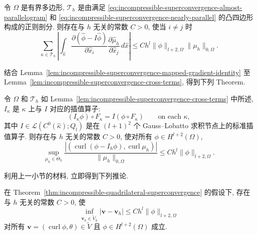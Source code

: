 \begin{Lemma}\label{lem:incompressible-superconvergence-cross-terms}
令 $\Omega$ 是有界多边形,
$\mathcal T_h$ 是由满足
\eqref{eq:incompressible-superconvergence-almost-parallelogram}
和 \eqref{eq:incompressible-superconvergence-nearly-parallel}
的凸四边形构成的正则剖分.
则存在与 $h$ 无关的常数 $C>0$, 使当 $i\ne j$ 时
\begin{equation}\label{eq:incompressible-superconvergence-cross-terms}
\sum_{\kappa\in\mathcal T_h}
\left|
\int_{\widehat\kappa}
\frac{\partial(\widehat\phi-I\widehat\phi)}
{\partial\widehat x_i}
\frac{\partial\widehat\mu_h}{\partial\widehat x_j}
\,d\widehat x
\right|
\leq Ch^l\|\phi\|_{l+2,\Omega}\|\mu_h\|_{0,\Omega}.
\end{equation}
\end{Lemma}

结合 Lemma~\ref{lem:incompressible-superconvergence-mapped-gradient-identity}
至 Lemma~\ref{lem:incompressible-superconvergence-cross-terms},
得到下列 Theorem.

\begin{Theorem}\label{thm:incompressible-quadrilateral-superconvergence}
令 $\Omega$ 和 $\mathcal T_h$ 如
Lemma~\ref{lem:incompressible-superconvergence-cross-terms} 中所述,
$I_\kappa$ 是 $\kappa$ 上与 $I$ 对应的插值算子:
\[
(I_\kappa\phi)\circ F_\kappa
=I(\phi\circ F_\kappa)
\qquad\text{on each }\kappa,
\]
其中 $I\in\mathcal L(C^0(\widehat\kappa);Q_l)$
是在 $(l+1)^2$ 个 Gauss--Lobatto 求积节点上的标准插值算子.
则存在与 $h$ 无关的常数 $C>0$, 使对所有
$\phi\in H^{l+2}(\Omega)$,
\begin{equation}\label{eq:incompressible-quadrilateral-superconvergence}
\sup_{\mu_h\in\Theta_h}
\frac{|(\operatorname{curl}(\phi-I_h\phi),
\operatorname{curl}\mu_h)|}{\|\mu_h\|_{0,\Omega}}
\leq Ch^l\|\phi\|_{l+2,\Omega}.
\end{equation}
\end{Theorem}

利用上一小节的材料, 立即得到下列推论.

\begin{Corollary}\label{cor:incompressible-quadrilateral-kernel-superconvergence}
在 Theorem~\ref{thm:incompressible-quadrilateral-superconvergence}
的假设下, 存在与 $h$ 无关的常数 $C>0$, 使
\begin{equation}\label{eq:incompressible-quadrilateral-kernel-superconvergence}
\inf_{\mathbf v_h\in\widetilde V_h}|\mathbf v-\mathbf v_h|
\leq Ch^l\|\phi\|_{l+2,\Omega}
\end{equation}
对所有
$\mathbf v=(\operatorname{curl}\phi,\theta)\in\widetilde V$
且 $\phi\in H^{l+2}(\Omega)$ 成立.
\end{Corollary}
